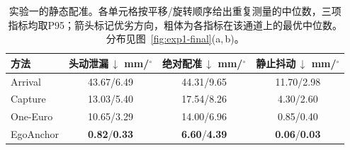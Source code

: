 \begin{table}[t]
\centering
\caption{实验一的静态配准。各单元格按平移/旋转顺序给出重复测量的中位数，三项指标均取P95；箭头标记优劣方向，粗体为各指标在该通道上的最优中位数。分布见图~\ref{fig:exp1-final}(a,\,b)。}
\label{tab:exp1-static}
\begin{tabular}{@{}lccc@{}}
\toprule
方法 & \shortstack{头动泄漏\,$\downarrow$\\mm/$^\circ$} & \shortstack{绝对配准\,$\downarrow$\\mm/$^\circ$} & \shortstack{静止抖动\,$\downarrow$\\mm/$^\circ$} \\
\midrule
Arrival & 43.67/6.49 & 44.31/9.65 & 11.70/2.98 \\
Capture & 13.03/5.40 & 17.54/8.26 & 4.30/2.60 \\
One-Euro & 10.65/3.29 & 14.00/6.96 & 0.85/0.40 \\
EgoAnchor & \textbf{0.82}/\textbf{0.33} & \textbf{6.60}/\textbf{4.39} & \textbf{0.06}/\textbf{0.03} \\
\bottomrule
\end{tabular}
\end{table}
